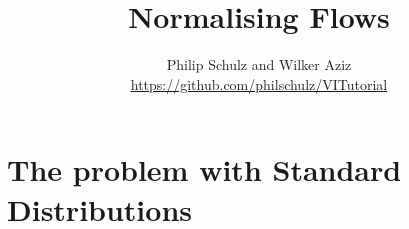 \documentclass[14pt]{beamer}
\title{Normalising Flows}
\author{Philip Schulz and Wilker Aziz\\
\url{https://github.com/philschulz/VITutorial}}
\date{}
\begin{document}
\begin{frame}
\maketitle
\end{frame}

\begin{frame}
\tableofcontents
\end{frame}

\section{The problem with Standard Distributions}

\begin{frame}
\tableofcontents[current]
\end{frame}
\end{document}
